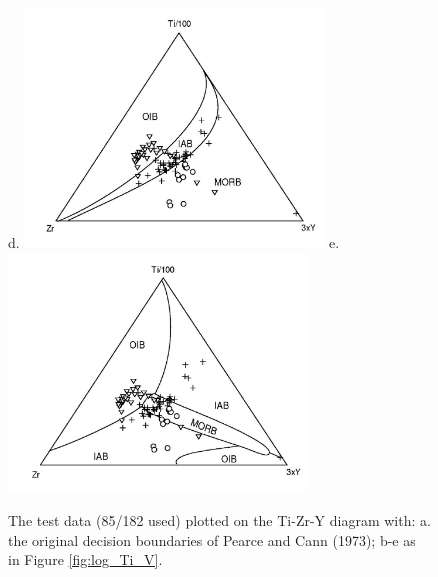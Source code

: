 \begin{figure}[htbp]
d.  \includegraphics[width=300]{figures/test_Ti_Zr_Y_lin.jpg}
e.  \includegraphics[width=300]{figures/test_Ti_Zr_Y_q.jpg}
  \caption[The test data plotted on the Ti-Zr-Y diagram]{
The  test data  (85/182 used)  plotted  on the  Ti-Zr-Y diagram  with:
a. the original decision boundaries  of Pearce and Cann (1973); b-e as
in Figure \ref{fig:log_Ti_V}.}
  \label{fig:log_Ti_Zr_Y}
\end{figure}


